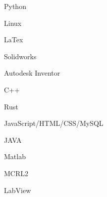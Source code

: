 \vspace{0.4cm}
\begin{cSection}{\textwidth}{0.47\textwidth}{0.48\textwidth}
    {%
        \begin{cSubsection}{}
            \begin{experienceItem} {}{Python}{}{} \end{experienceItem}
            \begin{experienceItem} {\hphantom{}}{Linux}{}{} \end{experienceItem}
            \begin{experienceItem} {\hphantom{}}{LaTex}{}{} \end{experienceItem}
            \begin{experienceItem} {\hphantom{}}{Solidworks}{}{} \end{experienceItem}
            \begin{experienceItem} {\hphantom{}}{Autodesk Inventor}{}{} \end{experienceItem}

            \begin{experienceItem} {}{C++}{}{} \end{experienceItem}
            \begin{experienceItem} {\hphantom{}}{Rust}{}{} \end{experienceItem}
            \begin{experienceItem} {\hphantom{}}{JavaScript/HTML/CSS/MySQL}{}{} \end{experienceItem}
            \begin{experienceItem} {\hphantom{}}{JAVA}{}{} \end{experienceItem}
            \begin{experienceItem} {\hphantom{}}{Matlab}{}{} \end{experienceItem}
            \begin{experienceItem} {\hphantom{}}{MCRL2}{}{} \end{experienceItem}
            \begin{experienceItem} {\hphantom{}}{LabView}{}{} \end{experienceItem}
        \end{cSubsection}


}
\end{cSection}
